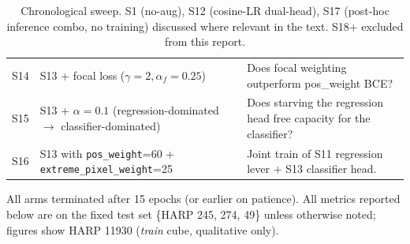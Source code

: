\begin{table}[h]
\begin{tabular}{@{}l p{5.4cm} p{8.2cm}@{}}
S14 & S13 + focal loss (\(\gamma{=}2, \alpha_f{=}0.25\)) & Does focal weighting outperform pos\_weight BCE? \\
\rowcolor{tabhdr}S15 & S13 + \(\alpha{=}0.1\) (regression-dominated $\to$ classifier-dominated) & Does starving the regression head free capacity for the classifier? \\
S16 & S13 with \texttt{pos\_weight}{=}60 + \texttt{extreme\_pixel\_weight}{=}25 & Joint train of S11 regression lever \(+\) S13 classifier head. \\
\bottomrule
\end{tabular}
\caption{Chronological sweep. S1 (no-aug), S12 (cosine-LR dual-head),
S17 (post-hoc inference combo, no training) discussed where relevant
in the text. S18+ excluded from this report.}
\end{table}

All arms terminated after 15 epochs (or earlier on patience). All
metrics reported below are on the fixed test set
\{HARP 245, 274, 49\} unless otherwise noted; figures show
HARP 11930 (\emph{train} cube, qualitative only).
